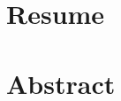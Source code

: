 \documentclass[Rapport/Rapport_main.tex]{subfiles}
\begin{document}
\section{Resume}

\section{Abstract}
\end{document}
